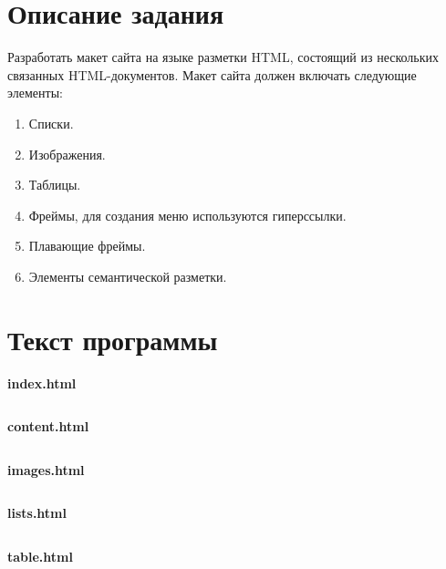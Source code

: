 \documentclass[20pt,a4paper]{report}
\begin{document}
	\chapter{Описание задания}
		\large
		\qquad Разработать макет сайта на языке разметки HTML, состоящий из нескольких связанных HTML-документов. Макет сайта должен включать следующие элементы: \\
		\begin{enumerate}
			\item Списки.
			\item Изображения.
			\item Таблицы.
			\item Фреймы, для создания меню используются гиперссылки.
			\item Плавающие фреймы.
			\item Элементы семантической разметки.
		\end{enumerate}

	\chapter{Текст программы}
		\qquad \textbf{index.html} \\
		\small
		\inputminted[tabsize=4, linenos]{html}{index.html}
		\large
		
		\qquad \textbf{content.html} \\
		\small
		\inputminted[tabsize=4, linenos]{html}{content.html}
		\large
		
		\qquad \textbf{images.html} \\
		\small
		\inputminted[tabsize=4, linenos]{html}{images.html}
		\large
		
		\qquad \textbf{lists.html} \\
		\small
		\inputminted[tabsize=4, linenos]{html}{lists.html}
		\large
		
		\qquad \textbf{table.html} \\
		\small
		\inputminted[tabsize=4, linenos]{html}{table.html}
		\large
		
\end{document}
